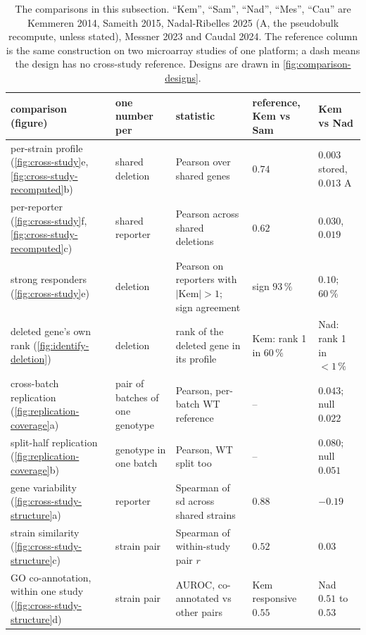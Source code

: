 \begin{table}[htbp]
\centering\footnotesize
\caption[]{The comparisons in this subsection. ``Kem'', ``Sam'', ``Nad'', ``Mes'',
``Cau'' are Kemmeren 2014, Sameith 2015, Nadal-Ribelles 2025 (A, the pseudobulk
recompute, unless stated), Messner 2023 and Caudal 2024. The reference column is the
same construction on two microarray studies of one platform; a dash means the design
has no cross-study reference. Designs are drawn in \cref{fig:comparison-designs}.}
\begin{tabular}{>{\raggedright\arraybackslash}p{29mm}>{\raggedright\arraybackslash}p{23mm}>{\raggedright\arraybackslash}p{40mm}>{\raggedright\arraybackslash}p{36mm}>{\raggedright\arraybackslash}p{34mm}}
\toprule
comparison (figure) & one number per & statistic & reference, Kem vs Sam & Kem vs Nad \\
\midrule
per-strain profile (\ref{fig:cross-study}e, \ref{fig:cross-study-recomputed}b) & shared deletion & Pearson over shared genes & $0.74$ & $0.003$ stored, $0.013$ A \\
per-reporter (\ref{fig:cross-study}f, \ref{fig:cross-study-recomputed}c) & shared reporter & Pearson across shared deletions & $0.62$ & $0.030$, $0.019$ \\
strong responders (\ref{fig:cross-study}e) & deletion & Pearson on reporters with $|\mathrm{Kem}| > 1$; sign agreement & sign $93\,\%$ & $0.10$; $60\,\%$ \\
deleted gene's own rank (\ref{fig:identify-deletion}) & deletion & rank of the deleted gene in its profile & Kem: rank 1 in $60\,\%$ & Nad: rank 1 in $< 1\,\%$ \\
cross-batch replication (\ref{fig:replication-coverage}a) & pair of batches of one genotype & Pearson, per-batch WT reference & -- & $0.043$; null $0.022$ \\
split-half replication (\ref{fig:replication-coverage}b) & genotype in one batch & Pearson, WT split too & -- & $0.080$; null $0.051$ \\
gene variability (\ref{fig:cross-study-structure}a) & reporter & Spearman of sd across shared strains & $0.88$ & $-0.19$ \\
strain similarity (\ref{fig:cross-study-structure}c) & strain pair & Spearman of within-study pair $r$ & $0.52$ & $0.03$ \\
GO co-annotation, within one study (\ref{fig:cross-study-structure}d) & strain pair & AUROC, co-annotated vs other pairs & Kem responsive $0.55$ & Nad $0.51$ to $0.53$ \\

\end{tabular}
\end{table}
